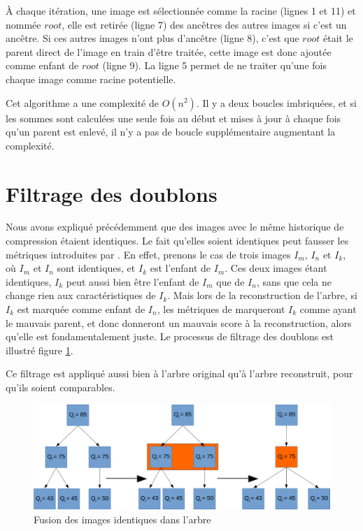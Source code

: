\documentclass[utf8,final]{stageM2R} %
\begin{document}
À chaque itération, une image est sélectionnée comme la racine (lignes 1 et 11) et nommée $root$, elle est retirée (ligne 7) des ancêtres des autres images si c'est un ancêtre. Si ces autres images n'ont plus d'ancêtre (ligne 8), c'est que $root$ était le parent direct de l'image en train d'être traitée, cette image est donc ajoutée comme enfant de $root$ (ligne 9). La ligne 5 permet de ne traiter qu'une fois chaque image comme racine potentielle.

Cet algorithme a une complexité de $O(n^{2})$. Il y a deux boucles imbriquées, et si les sommes sont calculées une seule fois au début et mises à jour à chaque fois qu'un parent est enlevé, il n'y a pas de boucle supplémentaire augmentant la complexité.

\section{Filtrage des doublons}
\label{sec:filtrage}
Nous avons expliqué précédemment que des images avec le même historique de compression étaient identiques. Le fait qu'elles soient identiques peut fausser les métriques introduites par . En effet, prenons le cas de trois images $I_m$, $I_n$ et $I_k$, où $I_m$ et $I_n$ sont identiques, et $I_k$ est l'enfant de $I_m$. Ces deux images étant identiques, $I_k$ peut aussi bien être l'enfant de $I_m$ que de $I_n$, sans que cela ne change rien aux caractéristiques de $I_k$. Mais lors de la reconstruction de l'arbre, si $I_k$ est marquée comme enfant de $I_n$, les métriques de  marqueront $I_k$ comme ayant le mauvais parent, et donc donneront un mauvais score à la reconstruction, alors qu'elle est fondamentalement juste. Le processus de filtrage des doublons est illustré figure \ref{fig:identique}. 

Ce filtrage est appliqué aussi bien à l'arbre original qu'à l'arbre reconstruit, pour qu'ils soient comparables.


\begin{figure}
\centering
\includegraphics[width=0.9\linewidth]{images/fusion_1}
\caption{Fusion des images identiques dans l'arbre}
\label{fig:identique}
\end{figure}
\end{document}
